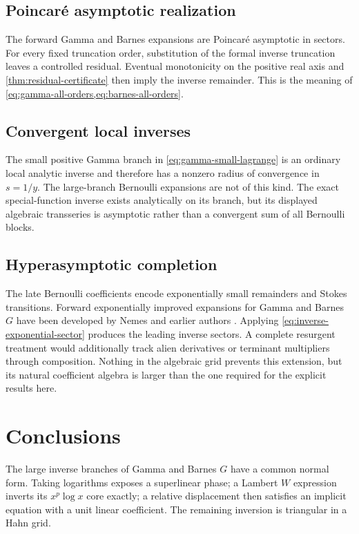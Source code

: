 \documentclass[11pt,oneside]{article}
\theoremstyle{plain}
\theoremstyle{definition}
\theoremstyle{remark}
\begin{document}
\subsection{Poincar\'e asymptotic realization}

The forward Gamma and Barnes expansions are Poincar\'e asymptotic in sectors.
For every fixed truncation order, substitution of the formal inverse
truncation leaves a controlled residual.  Eventual monotonicity on the positive
real axis and \cref{thm:residual-certificate} then imply the inverse remainder.
This is the meaning of \cref{eq:gamma-all-orders,eq:barnes-all-orders}.

\subsection{Convergent local inverses}

The small positive Gamma branch in \cref{eq:gamma-small-lagrange} is an
ordinary local analytic inverse and therefore has a nonzero radius of
convergence in \(s=1/y\).  The large-branch Bernoulli expansions are not of
this kind.  The exact special-function inverse exists analytically on its
branch, but its displayed algebraic transseries is asymptotic rather than a
convergent sum of all Bernoulli blocks.

\subsection{Hyperasymptotic completion}

The late Bernoulli coefficients encode exponentially small remainders and
Stokes transitions.  Forward exponentially improved expansions for Gamma and
Barnes \(G\) have been developed by Nemes and earlier authors
\cite{NemesGamma,NemesBarnes}.  Applying
\cref{eq:inverse-exponential-sector} produces the leading inverse sectors.
A complete resurgent treatment would additionally track alien derivatives or
terminant multipliers through composition.  Nothing in the algebraic grid
prevents this extension, but its natural coefficient algebra is larger than
the one required for the explicit results here.

\section{Conclusions}
\label{sec:conclusions}

The large inverse branches of Gamma and Barnes \(G\) have a common normal
form.  Taking logarithms exposes a superlinear phase; a Lambert \(W\)
expression inverts its \(x^p\log x\) core exactly; a relative displacement
then satisfies an implicit equation with a unit linear coefficient.  The
remaining inversion is triangular in a Hahn grid.
\end{document}
